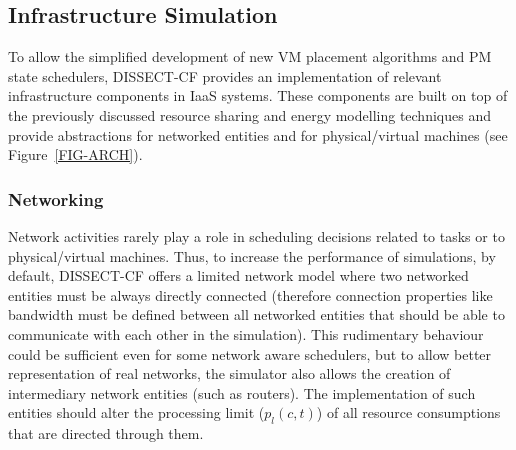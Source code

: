 \documentclass[sort, compress, 5p]{elsarticle}
\begin{document}
\subsection{Infrastructure Simulation}

To allow the simplified development of new VM placement algorithms and PM state schedulers, DISSECT-CF provides an implementation of relevant infrastructure components in IaaS systems. These components are built on top of the previously discussed resource sharing and energy modelling techniques and provide abstractions for networked entities and for physical/virtual machines (see Figure~\ref{FIG-ARCH}). 

\subsubsection{Networking} \label{Sec-NW}
Network activities rarely play a role in scheduling decisions related to tasks or to physical/virtual machines. Thus, to increase the performance of simulations, by default, DISSECT-CF offers a limited network model where two networked entities must be always directly connected (therefore connection properties like bandwidth must be defined between all networked entities that should be able to communicate with each other in the simulation). This rudimentary behaviour could be sufficient even for some network aware schedulers, but to allow better representation of real networks, the simulator also allows the creation of intermediary network entities (such as routers). The implementation of such entities should alter the processing limit ($p_l(c,t)$) of all resource consumptions that are directed through them.
\end{document}
